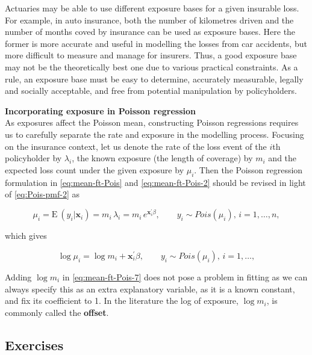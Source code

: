 \documentclass[]{book}
\theoremstyle{definition}
\theoremstyle{definition}
\theoremstyle{definition}
\theoremstyle{remark}
\begin{document}
Actuaries may be able to use different exposure bases for a given
insurable loss. For example, in auto insurance, both the number of
kilometres driven and the number of months coved by insurance can be
used as exposure bases. Here the former is more accurate and useful in
modelling the losses from car accidents, but more difficult to measure
and manage for insurers. Thus, a good exposure base may not be the
theoretically best one due to various practical constraints. As a rule,
an exposure base must be easy to determine, accurately measurable,
legally and socially acceptable, and free from potential manipulation by
policyholders.

\textbf{Incorporating exposure in Poisson regression}\\
As exposures affect the Poisson mean, constructing Poisson regressions
requires us to carefully separate the rate and exposure in the modelling
process. Focusing on the insurance context, let us denote the rate of
the loss event of the \(i\)th policyholder by \(\lambda_i\), the known
exposure (the length of coverage) by \(m_i\) and the expected loss count
under the given exposure by \(\mu_i\). Then the Poisson regression
formulation in \eqref{eq:mean-ft-Pois} and \eqref{eq:mean-ft-Pois-2} should
be revised in light of \eqref{eq:Pois-pmf-2} as

\begin{equation}
\mu_i=\mathrm{E~}{(y_i|\mathbf{ x}_i)}=m_i \,\lambda_i=m_i \, e^{\mathbf{ x}^{\prime}_i\beta}, \qquad y_i \sim Pois(\mu_i), \, i=1, \ldots, n,
\label{eq:mean-ft-Pois-6}
\end{equation}

which gives

\begin{equation}
\log \mu_i=\log m_i+\mathbf{ x}^{\prime}_i\beta, \qquad y_i \sim Pois(\mu_i), \, i=1, \ldots,
\label{eq:mean-ft-Pois-7}
\end{equation}

Adding \(\log m_i\) in \eqref{eq:mean-ft-Pois-7} does not pose a problem
in fitting as we can always specify this as an extra explanatory
variable, as it is a known constant, and fix its coefficient to 1. In
the literature the log of exposure, \(\log m_i\), is commonly called the
\textbf{offset}.

\subsection{Exercises}\label{exercises-4}
\end{document}
